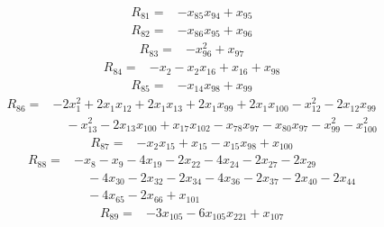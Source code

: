 \begin{equation*}\begin{split}
R_{81}={}&-x_{85} x_{94} + x_{95}
\end{split}\end{equation*}
\begin{equation*}\begin{split}
R_{82}={}&-x_{86} x_{95} + x_{96}
\end{split}\end{equation*}
\begin{equation*}\begin{split}
R_{83}={}&-x_{96}^{2} + x_{97}
\end{split}\end{equation*}
\begin{equation*}\begin{split}
R_{84}={}&-x_{2} - x_{2} x_{16} + x_{16} + x_{98}
\end{split}\end{equation*}
\begin{equation*}\begin{split}
R_{85}={}&-x_{14} x_{98} + x_{99}
\end{split}\end{equation*}
\begin{equation*}\begin{split}
R_{86}={}&-2x_{1}^{2} + 2x_{1} x_{12} + 2x_{1} x_{13} + 2x_{1} x_{99} + 2x_{1} x_{100} - x_{12}^{2} - 2x_{12} x_{99}\\
&\quad -x_{13}^{2} - 2x_{13} x_{100} + x_{17} x_{102} - x_{78} x_{97} - x_{80} x_{97} - x_{99}^{2} - x_{100}^{2}
\end{split}\end{equation*}
\begin{equation*}\begin{split}
R_{87}={}&-x_{2} x_{15} + x_{15} - x_{15} x_{98} + x_{100}
\end{split}\end{equation*}
\begin{equation*}\begin{split}
R_{88}={}&-x_{8} - x_{9} - 4x_{19} - 2x_{22} - 4x_{24} - 2x_{27} - 2x_{29}\\
&\quad -4x_{30} - 2x_{32} - 2x_{34} - 4x_{36} - 2x_{37} - 2x_{40} - 2x_{44}\\
&\quad -4x_{65} - 2x_{66} + x_{101}
\end{split}\end{equation*}
\begin{equation*}\begin{split}
R_{89}={}&-3x_{105} - 6x_{105} x_{221} + x_{107}
\end{split}\end{equation*}
